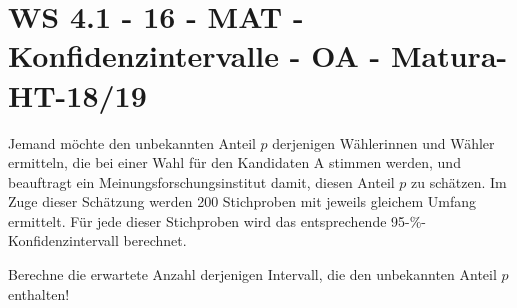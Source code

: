 \section{WS 4.1 - 16 - MAT - Konfidenzintervalle - OA - Matura-HT-18/19}

\begin{beispiel}[WS 4.1]{1}
Jemand möchte den unbekannten Anteil $p$ derjenigen Wählerinnen und Wähler ermitteln, die bei
einer Wahl für den Kandidaten A stimmen werden, und beauftragt ein Meinungsforschungsinstitut
damit, diesen Anteil $p$ zu schätzen. Im Zuge dieser Schätzung werden 200 Stichproben
mit jeweils gleichem Umfang ermittelt. Für jede dieser Stichproben wird das entsprechende
95-\%-Konfidenzintervall berechnet.\leer


Berechne die erwartete Anzahl derjenigen Intervall, die den unbekannten Anteil $p$ enthalten!

\end{beispiel}